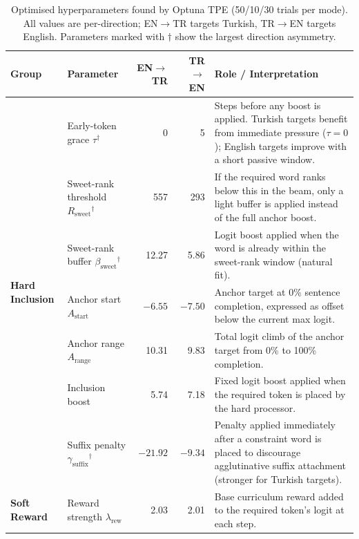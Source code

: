 \documentclass{tlp}
\begin{document}
\begin{table}[htbp]
  \centering
  \caption{Optimised hyperparameters found by Optuna TPE (50/10/30 trials per
    mode). All values are per-direction; EN$\rightarrow$TR targets Turkish,
    TR$\rightarrow$EN targets English. Parameters marked with $\dagger$ show the
    largest direction asymmetry.}
  \label{tab:hpo_params}
  {\small
    \renewcommand{\arraystretch}{0.90}
    \setlength{\tabcolsep}{2pt}
    \begin{tabular}{llrrp{3.5cm}}
      \toprule
      Group & Parameter & EN$\rightarrow$TR & TR$\rightarrow$EN &
        Role / Interpretation \\
      \midrule
      \multirow{7}{*}{\textbf{Hard Inclusion}}
        & Early-token grace $\tau$$^\dagger$ & 0 & 5
          & Steps before any boost is applied. Turkish targets benefit from
            immediate pressure ($\tau{=}0$); English targets improve with a
            short passive window. \\
        & Sweet-rank threshold $R_{\text{sweet}}$$^\dagger$ & 557 & 293
          & If the required word ranks below this in the beam, only a light
            buffer is applied instead of the full anchor boost. \\
        & Sweet-rank buffer $\beta_{\text{sweet}}$$^\dagger$ & 12.27 & 5.86
          & Logit boost applied when the word is already within the sweet-rank
            window (natural fit). \\
        & Anchor start $A_{\text{start}}$ & $-6.55$ & $-7.50$
          & Anchor target at 0\% sentence completion, expressed as offset
            below the current max logit. \\
        & Anchor range $A_{\text{range}}$ & 10.31 & 9.83
          & Total logit climb of the anchor target from 0\% to 100\%
            completion. \\
        & Inclusion boost & 5.74 & 7.18
          & Fixed logit boost applied when the required token is placed by
            the hard processor. \\
        & Suffix penalty $\gamma_{\text{suffix}}$$^\dagger$ & $-21.92$ & $-9.34$
          & Penalty applied immediately after a constraint word is placed to
            discourage agglutinative suffix attachment (stronger for Turkish
            targets). \\
      \midrule
      \multirow{4}{*}{\textbf{Soft Reward}}
        & Reward strength $\lambda_{\text{rew}}$ & 2.03 & 2.01
          & Base curriculum reward added to the required token's logit at each step. \\

\end{tabular}}
\end{table}
\end{document}
